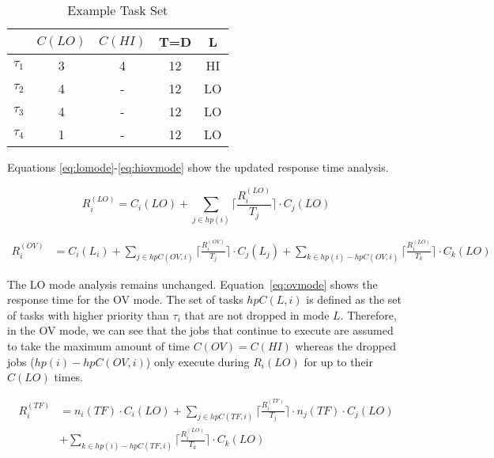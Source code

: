 	
	
\section{}
	
	
	\begin{table}[t!]
\caption{Example Task Set}
\centering

	\begin{tabular}{@{}lcccc@{}}
	\toprule
	& $C(LO)$ & $C(HI)$ & T=D & L 	 \\
	\bottomrule
	$\tau_1$ & 3 & 4 & 12 & HI  \\
	$\tau_2$ & 4 & - & 12 & LO  \\
	$\tau_3$ & 4 & - & 12 & LO  \\
	$\tau_4$ & 1 & - & 12 & LO  \\
	\end{tabular}

\label{t:example}
\end{table}
	
	Equations \ref{eq:lomode}-\ref{eq:hiovmode} show the updated response time analysis.
	
	
\begin{equation}
R_i^{(LO)}= C_i(LO)+\sum_{j \in hp(i)}\Big\lceil\frac{R_i^{(LO)}}{T_j}\Big\rceil \cdot C_j(LO)
\label{eq:lomode}
\end{equation}

\begin{equation}\label{eq:ovmode}
\begin{aligned}
R_i^{(OV)} &  = C_i(L_i)+\sum_{j \in hpC(OV,i)}\Big\lceil\frac{R_i^{(OV)}}{T_j}\Big\rceil \cdot C_j(L_j) 
 +\sum_{k \in hp(i)-hpC(OV,i)}\Big\lceil\frac{R_i^{(LO)}}{T_k}\Big\rceil \cdot C_k(LO)
\end{aligned}
\end{equation}
	
	
	The LO mode analysis remains unchanged. Equation~\ref{eq:ovmode} shows the response time for the OV mode. 
	The set of tasks $hpC(L,i)$ is defined as the set of tasks with higher priority than $\tau_i$ that are not dropped in mode $L$. 
	Therefore, in the OV mode, we can see that the jobs that continue to execute are assumed to take the maximum amount of time $C(OV)=C(HI)$ whereas the dropped jobs ($hp(i) - hpC(OV,i)$) only execute during $R_i(LO)$ for up to their $C(LO)$ times.
	
\begin{equation}\label{eq:tfmode}
\begin{aligned}
R_i^{(TF)} & = n_i(TF) \cdot C_i(LO)
+\sum_{j \in hpC(TF,i)}\Big\lceil\frac{R_i^{(TF)}}{T_j}\Big\rceil \cdot n_j(TF) \cdot C_j(LO) \\
&  +\sum_{k \in hp(i)-hpC(TF,i)}\Big\lceil\frac{R_i^{(LO)}}{T_k}\Big\rceil \cdot C_k(LO)
\end{aligned}
\end{equation}

